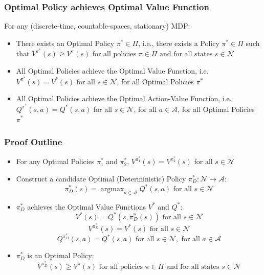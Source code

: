 \documentclass[handout]{beamer}
\DeclareMathOperator*{\argmax}{argmax}
\begin{document}
\begin{frame}
\frametitle{Optimal Policy achieves Optimal Value Function}
\begin{theorem}
For any (discrete-time, countable-spaces, stationary) MDP:
\pause
\begin{itemize}[<+->]
\item There exists an Optimal Policy $\pi^* \in \Pi$, i.e., there exists a Policy $\pi^* \in \Pi$ such that $V^{\pi^*}(s) \geq V^{\pi}(s) \text{ for all policies  } \pi \in \Pi \mbox{ and for all states } s \in \mathcal{N}$
\item All Optimal Policies achieve the Optimal Value Function, i.e. $V^{\pi^*}(s) = V^*(s)$ for all $s \in \mathcal{N}$, for all Optimal Policies $\pi^*$
\item All Optimal Policies achieve the Optimal Action-Value Function, i.e. $Q^{\pi^*}(s,a) = Q^*(s,a)$ for all $s \in \mathcal{N}$, for all $a \in \mathcal{A}$, for all Optimal Policies $\pi^*$
\end{itemize}
\label{th:optimal-policy-achieves-optimal-value-function}
\end{theorem}
\end{frame}

\begin{frame}
\frametitle{Proof Outline}
\pause
\begin{itemize}[<+->]
\item For any Optimal Policies $\pi_1^*$ and $\pi_2^*$, $V^{\pi_1^*}(s) = V^{\pi_2^*}(s)$ for all $s \in \mathcal{N}$
\item Construct a candidate Optimal (Deterministic) Policy $\pi_D^* : \mathcal{N} \rightarrow \mathcal{A}$:
 $$\pi_D^*(s) = \argmax_{a \in \mathcal{A}} Q^*(s,a) \text{ for all } s \in \mathcal{N}$$
 \item $\pi_D^*$ achieves the Optimal Value Functions $V^*$ and $Q^*$:
 $$V^*(s) = Q^*(s,\pi_D^*(s)) \text{ for all } s \in \mathcal{N}$$
 $$V^{\pi_D^*}(s) = V^*(s) \text{ for all } s \in \mathcal{N}$$
$$Q^{\pi_D^*}(s,a) = Q^*(s,a) \text{ for all } s \in \mathcal{N}, \text{ for all } a \in \mathcal{A}$$
\item $\pi_D^*$ is an Optimal Policy:
$$V^{\pi_D^*}(s) \geq V^{\pi}(s) \text{ for all policies  } \pi \in \Pi \text{ and for all states } s \in \mathcal{N}$$
\end{itemize}
\end{frame}
\end{document}
